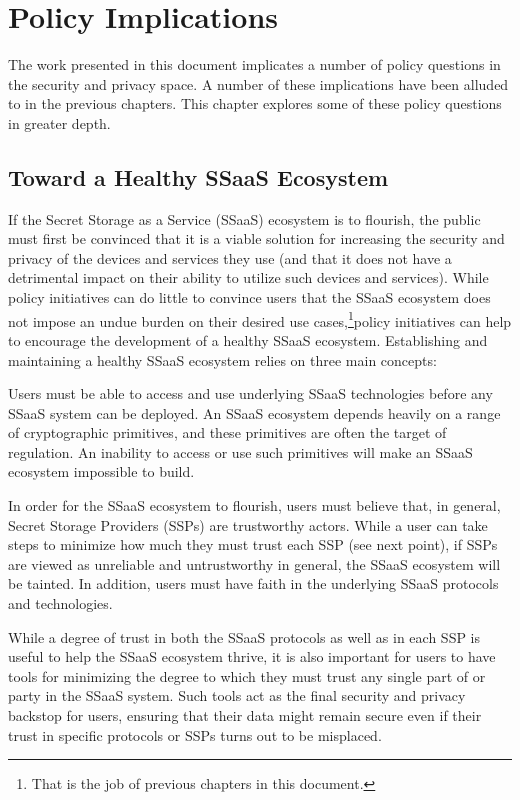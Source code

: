 \chapter{Policy Implications}
\label{chap:policy}

The work presented in this document implicates a number of policy
questions in the security and privacy space. A number of these
implications have been alluded to in the previous chapters. This
chapter explores some of these policy questions in greater depth.

\section{Toward a Healthy SSaaS Ecosystem}

If the Secret Storage as a Service (SSaaS) ecosystem is to flourish,
the public must first be convinced that it is a viable solution for
increasing the security and privacy of the devices and services they
use (and that it does not have a detrimental impact on their ability
to utilize such devices and services). While policy initiatives can do
little to convince users that the SSaaS ecosystem does not impose an
undue burden on their desired use cases,\footnote{That is the job of
  previous chapters in this document.}policy initiatives can help to
encourage the development of a healthy SSaaS ecosystem. Establishing
and maintaining a healthy SSaaS ecosystem relies on three main
concepts:

\begin{packed_desc}
\item[Availability of Cryptography:] Users must be able to access and
  use underlying SSaaS technologies before any SSaaS system can be
  deployed. An SSaaS ecosystem depends heavily on a range of
  cryptographic primitives, and these primitives are often the target
  of regulation. An inability to access or use such primitives will
  make an SSaaS ecosystem impossible to build.
\item[Maximizing SSP Trustworthiness:] In order for the SSaaS
  ecosystem to flourish, users must believe that, in general, Secret
  Storage Providers (SSPs) are trustworthy actors. While a user can
  take steps to minimize how much they must trust each SSP (see next
  point), if SSPs are viewed as unreliable and untrustworthy in
  general, the SSaaS ecosystem will be tainted. In addition, users
  must have faith in the underlying SSaaS protocols and technologies.
\item[Minimizing Mandatory Trust:] While a degree of trust in both the
  SSaaS protocols as well as in each SSP is useful to help the SSaaS
  ecosystem thrive, it is also important for users to have tools for
  minimizing the degree to which they must trust any single part of or
  party in the SSaaS system. Such tools act as the final security and
  privacy backstop for users, ensuring that their data might remain
  secure even if their trust in specific protocols or SSPs turns out
  to be misplaced.
\end{packed_desc}

